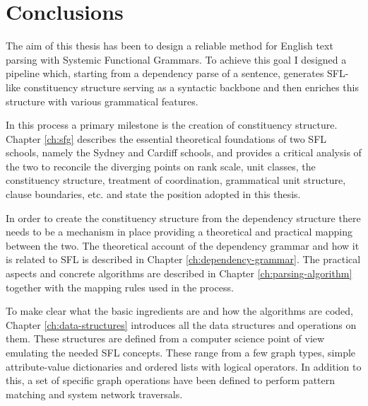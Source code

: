 \chapter{Conclusions}
\label{ch:conclusions}


    The aim of this thesis has been to design a reliable method for English text parsing with Systemic Functional Grammars. To achieve this goal I designed a pipeline which, starting from a dependency parse of a sentence, generates SFL-like constituency structure serving as a syntactic backbone and then enriches this structure with various grammatical features. 

    In this process a primary milestone is the creation of constituency structure. Chapter \ref{ch:sfg} describes the essential theoretical foundations of two SFL schools, namely the Sydney and Cardiff schools, and provides a critical analysis of the two to reconcile the diverging points on rank scale, unit classes, the constituency structure, treatment of coordination, grammatical unit structure, clause boundaries, etc. and state the position adopted in this thesis. 

    In order to create the constituency structure from the dependency structure there needs to be a mechanism in place providing a theoretical and practical mapping between the two. The theoretical account of the dependency grammar and how it is related to SFL is described in Chapter \ref{ch:dependency-grammar}. The practical aspects and concrete algorithms are described in Chapter \ref{ch:parsing-algorithm} together with the mapping rules used in the process. 

    To make clear what the basic ingredients are and how the algorithms are coded, Chapter \ref{ch:data-structures} introduces all the data structures and operations on them. These structures are defined from a computer science point of view emulating the needed SFL concepts. These range from a few graph types, simple attribute-value dictionaries and ordered lists with logical operators. In addition to this, a set of specific graph operations have been defined to perform pattern matching and system network traversals.

